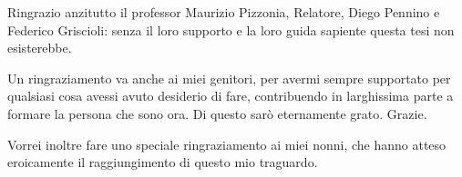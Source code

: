 \medskip
\medskip
Ringrazio anzitutto il professor Maurizio Pizzonia, Relatore, Diego Pennino e Federico Griscioli: senza il loro supporto e la loro guida sapiente questa tesi non esisterebbe.

\medskip
\medskip
Un ringraziamento va anche ai miei genitori, per avermi sempre supportato per qualsiasi cosa avessi avuto desiderio di fare, contribuendo in larghissima parte a formare la persona che sono ora. Di questo sarò eternamente grato. Grazie.

\medskip
\medskip
Vorrei inoltre fare uno speciale ringraziamento ai miei nonni, che hanno atteso eroicamente il raggiungimento di questo mio traguardo.

